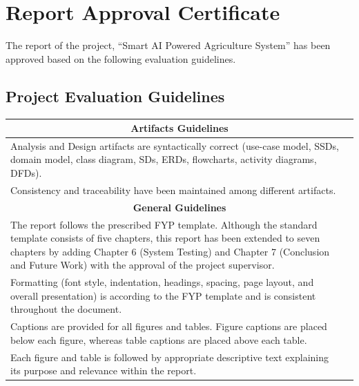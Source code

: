 
\chapter*{Report Approval Certificate}

\noindent
The report of the project, ``Smart AI Powered Agriculture System'' has been approved based on the following evaluation guidelines.

\section*{Project Evaluation Guidelines}

{
\small
\renewcommand{\arraystretch}{1.5}

\begin{tabularx}{\textwidth}{|X|p{2cm}|}
    \hline
    \multicolumn{2}{|c|}{\textbf{Artifacts Guidelines}} \\
    \hline
    Analysis and Design artifacts are syntactically correct (use-case model, SSDs, domain model, class diagram, SDs, ERDs, flowcharts, activity diagrams, DFDs). & \\
    \hline
    Consistency and traceability have been maintained among different artifacts. & \\
    \hline

    \multicolumn{2}{|c|}{\textbf{General Guidelines}} \\
    \hline
    The report follows the prescribed FYP template. Although the standard template consists of five chapters, this report has been extended to seven chapters by adding Chapter 6 (System Testing) and Chapter 7 (Conclusion and Future Work) with the approval of the project supervisor. & \\
    \hline
    Formatting (font style, indentation, headings, spacing, page layout, and overall presentation) is according to the FYP template and is consistent throughout the document. & \\
    \hline
    Captions are provided for all figures and tables. Figure captions are placed below each figure, whereas table captions are placed above each table. & \\
    \hline
    Each figure and table is followed by appropriate descriptive text explaining its purpose and relevance within the report. & \\
    \hline
\end{tabularx}
}

